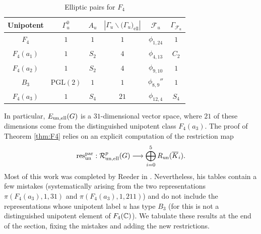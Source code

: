 \begin{table}[ht]
    \centering
    \begin{tabular}{|c|c|c|c|c|c|}
        \hline
        Unipotent & $\Gamma_u^0$ & $A_u$ & $|\Gamma_u\backslash\mathcal(\Gamma_u)_{\text{ell}}|$ & $\mathcal{F}_{u}$ & $\Gamma_{\mathcal{F}_u}$ \\\hline
        $F_4$ & $1$ & $1$ & $1$ & $\phi_{1,24}$ & $1$ \\\hline
        $F_4(a_1)$ & $1$ & $S_2$ & $4$ & $\phi_{4,13}$ & $C_2$ \\\hline
        $F_4(a_2)$ & $1$ & $S_2$ & $4$ & $\phi_{9,10}$ & $1$ \\\hline
        $B_3$ & $\text{PGL}(2)$ & $1$ & $1$ & $\phi_{8,9}''$ & $1$ \\\hline
        $F_4(a_3)$ & $1$ & $S_4$ & $21$ & $\phi_{12,4}$ & $S_4$\\\hline
    \end{tabular}
    \caption{Elliptic pairs for $F_4$}
    \label{tbl:F4_pairs}
\end{table}

In particular, $E_{\mathrm{un},\text{ell}}(G)$ is a $31$-dimensional vector space, where $21$ of these dimensions come from the distinguished unipotent class $F_4(a_3)$. The proof of Theorem \ref{thm:F4} relies on an explicit computation of the restriction map 
$$\mathrm{res}^{\mathrm{par}}_{\mathrm{un}}:\mathcal{R}_{\mathrm{un},\mathrm{ell}}^p(G)\longrightarrow\bigoplus_{i=0}^5 R_{\mathrm{un}}(\overline{K}_i).$$
Most of this work was completed by Reeder in \cite{Reeder2000}. Nevertheless, his tables contain a few mistakes (systematically arising from the two representations $\pi(F_4(a_3),1,31)$ and $\pi(F_4(a_3),1,211)$) and do not include the representations whose unipotent label $u$ has type $B_3$ (for this is not a distinguished unipotent element of $F_4(\mathbb{C})$). We tabulate these results at the end of the section, fixing the mistakes and adding the new restrictions.

